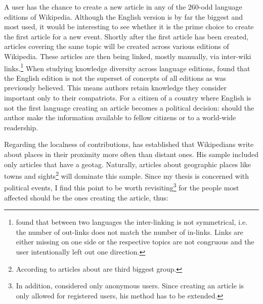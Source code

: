 

A user has the chance to create a new article in any of the 260-odd language editions of Wikipedia.
Although the English version is by far the biggest and most used, it would be interesting to see whether it is the prime choice to create the first article for a new event.
Shortly after the first article has been created, articles covering the same topic will be created across various editions of Wikipedia.
These articles are then being linked, mostly manually, via inter-wiki links.\footnote{\textcite{adar2009information} found that between two languages the inter-linking is not symmetrical, i.e. the number of out-links does not match the number of in-links. Links are either missing on one side or the respective topics are not congruous and the user intentionally left out one direction.}
When studying knowledge diversity across language editions, \textcite{hecht2010tower} found that the English edition is not the superset of concepts of all editions as was previously believed.
This means authors retain knowledge they consider important only to their compatriots. 
For a citizen of a country where English is not the first language creating an article becomes a political decision: should the author make the information available to fellow citizens or to a world-wide readership.


Regarding the localness of contributions, \textcite[57]{hardy2011volunteered} has established that Wikipedians write about places in their proximity more often than distant ones.
His sample included only articles that have a geotag.
Naturally, articles about geographic places like towns and sights\footnote{According to \textcite{kittur2009s} articles about  are third biggest group.} will dominate this sample.
Since my thesis is concerned with political events, I find this point to be worth revisiting\footnote{In addition, \textcite[61]{hardy2011volunteered} considered only anonymous users. Since creating an article is only allowed for registered users, his method has to be extended.} for the people most affected should be the ones creating the article, thus:

